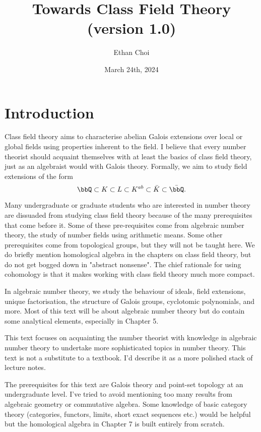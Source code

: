 \documentclass[a4paper, 12pt,oneside,openany]{book}
\title{\textbf{\Huge{Towards Class Field Theory}}\\ \vspace{0.5cm} \large{(version 1.0)}}
\author{\Large{Ethan Choi}}
\date{\Large{March 24th, 2024}\\}
\begin{document}
\maketitle
\dominitoc[n]

\tableofcontents

\clearpage
\pagestyle{fancy}
\chapter{Introduction}

Class field theory aims to characterise abelian Galois extensions over local or global fields using properties inherent to the field. I believe that every number theorist should acquaint themselves with at least the basics of class field theory, just as an algebraist would with Galois theory. Formally, we aim to study field extensions of the form $$\bbQ \subset K \subset L \subset K^{ab} \subset \bar{K} \subset \bar{\bbQ}.$$

Many undergraduate or graduate students who are interested in number theory are dissuaded from studying class field theory because of the many prerequisites that come before it. Some of these pre-requisites come from algebraic number theory, the study of number fields using arithmetic means. Some other prerequisites come from topological groups, but they will not be taught here. We do briefly mention homological algebra in the chapters on class field theory, but do not get bogged down in "abstract nonsense". The chief rationale for using cohomology is that it makes working with class field theory much more compact.

In algebraic number theory, we study the behaviour of ideals, field extensions, unique factorisation, the structure of Galois groups, cyclotomic polynomials, and more. Most of this text will be about algebraic number theory but do contain some analytical elements, especially in Chapter 5. 

This text focuses on acquainting the number theorist with knowledge in algebraic number theory to undertake more sophisticated topics in number theory. This text is not a substitute to a textbook. I'd describe it as a more polished stack of lecture notes.

The prerequisites for this text are Galois theory and point-set topology at an undergraduate level. I've tried to avoid mentioning too many results from algebraic geometry or commutative algebra. Some knowledge of basic category theory (categories, functors, limits, short exact sequences etc.) would be helpful but the homological algebra in Chapter 7 is built entirely from scratch.
\end{document}
